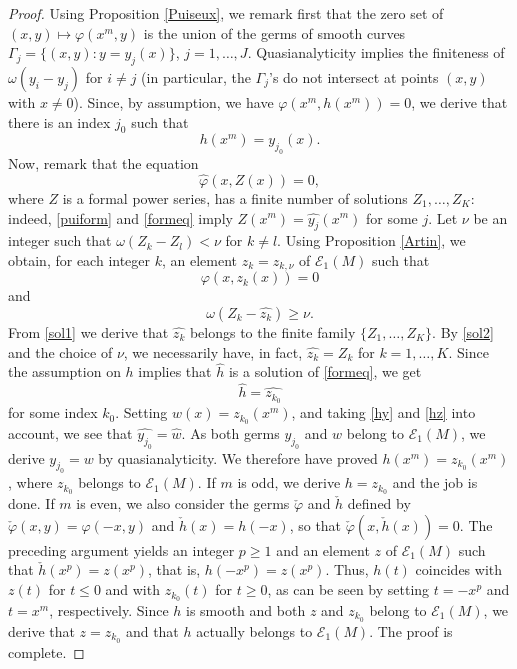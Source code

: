 \documentclass[a4paper]{amsart}
\theoremstyle{plain}
\theoremstyle{remark}
\begin{document}
\begin{proof} 
Using Proposition \ref{Puiseux}, we remark first that the zero set of $ (x,y)\mapsto \varphi(x^m,y)$ is the union of the germs of smooth curves $ \Gamma_j=\{(x,y): y=y_j(x)\} $, $ j=1,\ldots, J $. Quasianalyticity implies the finiteness of $ \omega(y_i-y_j) $ for $ i\neq j $ (in particular, the $ \Gamma_j $'s do not intersect at points $ (x,y) $ with $ x\neq 0 $). Since, by assumption, we have $ \varphi(x^m,h(x^m))=0 $, we derive that there is an index $ j_0 $ such that
\begin{equation}\label{hy}
h(x^m)=y_{j_0}(x).
\end{equation}
Now, remark that the equation
\begin{equation}\label{formeq}
\widehat{\varphi}(x,Z(x))=0,
\end{equation}
where $ Z $ is a formal power series, has a finite number of solutions $ Z_1,\ldots,Z_K $: indeed, \eqref{puiform} and \eqref{formeq} imply $ Z(x^m)=\widehat{y_j}(x^m) $ for some $ j $. 
Let $ \nu$ be an integer such that $ \omega(Z_k-Z_l)<\nu $ for $ k\neq l $. Using Proposition \ref{Artin}, we obtain, for each integer $ k $, an element $ z_k=z_{k,\nu} $ of $ \mathcal{E}_1(M) $ such that
\begin{equation}\label{sol1}
\varphi(x,z_k(x))=0 
\end{equation}
and 
\begin{equation}\label{sol2}
\omega(Z_k-\widehat{z_k})\geq \nu . 
\end{equation}
From \eqref{sol1} we derive that $ \widehat{z_k} $ belongs to the finite family
$ \{Z_1,\ldots,Z_K\} $. By \eqref{sol2} and the choice of $ \nu $, we necessarily have, in fact, $ \widehat{z_k}=Z_k $ for $ k=1,\ldots,K $. Since the assumption on $ h $ implies that $ \widehat{h} $ is a solution of \eqref{formeq}, we get
\begin{equation}\label{hz}
\widehat{h}=\widehat{z_{k_0}}
\end{equation}
for some index $ k_0 $. Setting $ w(x)=z_{k_0}(x^m) $, and taking \eqref{hy} and \eqref{hz} into account, we see that $ \widehat{y_{j_0}}=\widehat{w} $. As both germs $ y_{j_0} $ and $ w $ belong to $ \mathcal{E}_1(M) $, we derive $ y_{j_0}=w $ by quasianalyticity. We therefore have proved $ h(x^m)=z_{k_0}(x^m) $, where $ z_{k_0} $ belongs to $ \mathcal{E}_1(M) $. If $ m $ is odd, we derive $ h=z_{k_0} $ and the job is done. If $ m $ is even, we also consider the germs $ \check{\varphi} $ and $ \check{h} $ defined by $ \check{\varphi}(x,y)=\varphi(-x,y) $ and $ \check{h}(x)=h(-x) $, so that $ \check{\varphi}(x,\check{h}(x))=0 $. The preceding argument yields an integer $ p\geq 1 $ and an element $ z $ of $ \mathcal{E}_1(M) $ such that $ \check{h}(x^p)=z(x^p) $, that is, $ h(-x^p)=z(x^p) $. Thus, $ h(t) $ coincides with $ z(t) $ for $ t\leq 0 $ and with $ z_{k_0}(t) $ for $ t\geq 0 $, as can be seen by setting $ t=-x^p $ and $ t=x^m $, respectively. Since $ h $ is smooth and both $ z $ and $ z_{k_0} $ belong to $ \mathcal{E}_1(M) $, we derive that $z=z_{k_0} $ and that $ h $ actually belongs to $ \mathcal{E}_1(M) $. The proof is complete.
\end{proof}
\end{document}
